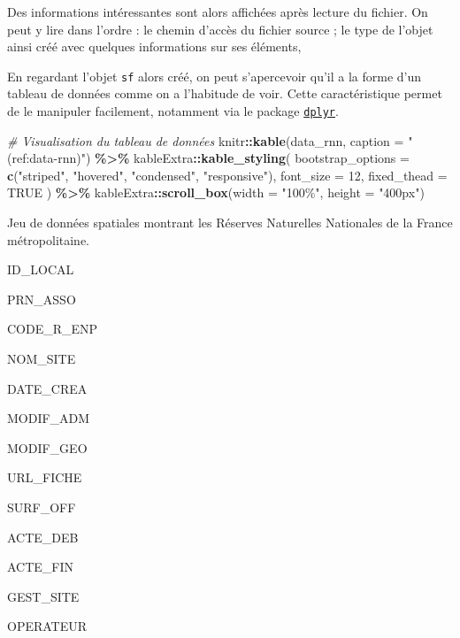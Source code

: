 \documentclass[
  french,
]{book}
\newenvironment{Shaded}{\begin{snugshade}}{\end{snugshade}}
\newcommand{\CommentTok}[1]{\textcolor[rgb]{0.56,0.35,0.01}{\textit{#1}}}
\newcommand{\DataTypeTok}[1]{\textcolor[rgb]{0.13,0.29,0.53}{#1}}
\newcommand{\DecValTok}[1]{\textcolor[rgb]{0.00,0.00,0.81}{#1}}
\newcommand{\KeywordTok}[1]{\textcolor[rgb]{0.13,0.29,0.53}{\textbf{#1}}}
\newcommand{\NormalTok}[1]{#1}
\newcommand{\OperatorTok}[1]{\textcolor[rgb]{0.81,0.36,0.00}{\textbf{#1}}}
\newcommand{\OtherTok}[1]{\textcolor[rgb]{0.56,0.35,0.01}{#1}}
\newcommand{\StringTok}[1]{\textcolor[rgb]{0.31,0.60,0.02}{#1}}
\begin{document}
Des informations intéressantes sont alors affichées après lecture du fichier. On peut y lire dans l'ordre : le chemin d'accès du fichier source ; le type de l'objet ainsi créé avec quelques informations sur ses éléments,

En regardant l'objet \texttt{sf} alors créé, on peut s'apercevoir qu'il a la forme d'un
tableau de données comme on a l'habitude de voir. Cette caractéristique permet
de le manipuler facilement, notamment via le package
\href{http://larmarange.github.io/analyse-R/manipuler-les-donnees-avec-dplyr.html}{\texttt{dplyr}}.

\begin{Shaded}
\begin{Highlighting}[]
\CommentTok{\# Visualisation du tableau de données}
\NormalTok{knitr}\OperatorTok{::}\KeywordTok{kable}\NormalTok{(data\_rnn, }\DataTypeTok{caption =} \StringTok{"(ref:data{-}rnn)"}\NormalTok{) }\OperatorTok{\%\textgreater{}\%}
\StringTok{  }\NormalTok{kableExtra}\OperatorTok{::}\KeywordTok{kable\_styling}\NormalTok{(}
    \DataTypeTok{bootstrap\_options =} \KeywordTok{c}\NormalTok{(}\StringTok{"striped"}\NormalTok{, }\StringTok{"hovered"}\NormalTok{, }\StringTok{"condensed"}\NormalTok{, }\StringTok{"responsive"}\NormalTok{),}
    \DataTypeTok{font\_size =} \DecValTok{12}\NormalTok{,}
    \DataTypeTok{fixed\_thead =} \OtherTok{TRUE}
\NormalTok{  ) }\OperatorTok{\%\textgreater{}\%}
\StringTok{  }\NormalTok{kableExtra}\OperatorTok{::}\KeywordTok{scroll\_box}\NormalTok{(}\DataTypeTok{width =} \StringTok{"100\%"}\NormalTok{, }\DataTypeTok{height =} \StringTok{"400px"}\NormalTok{)}
\end{Highlighting}
\end{Shaded}

\label{tab:data-rnn}Jeu de données spatiales montrant les Réserves Naturelles Nationales de la France métropolitaine.

ID\_LOCAL

PRN\_ASSO

CODE\_R\_ENP

NOM\_SITE

DATE\_CREA

MODIF\_ADM

MODIF\_GEO

URL\_FICHE

SURF\_OFF

ACTE\_DEB

ACTE\_FIN

GEST\_SITE

OPERATEUR
\end{document}
